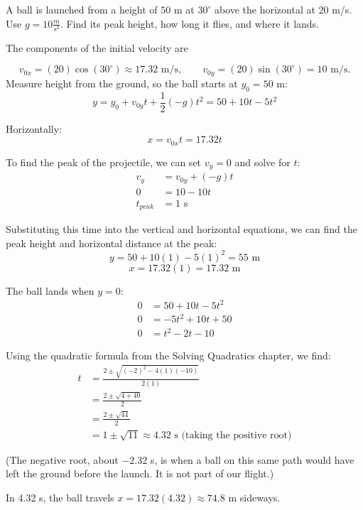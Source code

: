 \begin{Worked}
\begin{Problem}
A ball is launched from a height of $50$ m at
$30^\circ$ above the horizontal at $20$ m/s. Use $g = 10 \frac{m}{s^2}$.
Find its peak height, how long it flies, and where it lands.
\end{Problem}
\begin{Solution}
The components of the initial velocity are

$$v_{0x} = (20) \cos(30^\circ) \approx 17.32 \text{ m/s}, \qquad v_{0y} = (20) \sin(30^\circ) = 10 \text{ m/s}.$$
Measure height from the ground, so the ball starts at $y_0 = 50$ m:
\[y = y_0 + v_{0y} t + \frac{1}{2} (-g) t^2 = 50 + 10t - 5t^2\]

Horizontally:
\[x = v_{0x} t = 17.32t\]

To find the peak of the projectile, we can set $v_y = 0$ and solve for $t$:
\begin{align*}
    v_y &= v_{0y} + (-g) t \\
    0 &= 10 - 10t \\
    t_{peak} &= 1 \text{ s}
\end{align*}

Substituting this time into the vertical and horizontal equations, we can find the peak height and horizontal distance at the peak:
\[
y = 50 + 10(1) - 5(1)^2 = 55 \text{ m}
\]
\[
x = 17.32(1) = 17.32 \text{ m}
\]

The ball lands when $y = 0$:
\begin{align*}
    0 &= 50 + 10t - 5t^2 \\
    0 &= -5t^2 + 10t + 50 \\
    0 &= t^2 - 2t - 10
\end{align*}

Using the quadratic formula from the Solving Quadratics chapter, we find:
\begin{align*}
    t &= \frac{2 \pm \sqrt{(-2)^2 - 4(1)(-10)}}{2(1)} \\
    &= \frac{2 \pm \sqrt{4 + 40}}{2} \\
    &= \frac{2 \pm \sqrt{44}}{2} \\
    &= 1 \pm \sqrt{11} \approx 4.32 \text{ s (taking the positive root)}
\end{align*}

(The negative root, about $-2.32$ s, is when a ball on this same path would
have left the ground before the launch. It is not part of our flight.)

In 4.32 s, the ball travels $x = 17.32(4.32) \approx 74.8$ m sideways.
\end{Solution}
\end{Worked}

